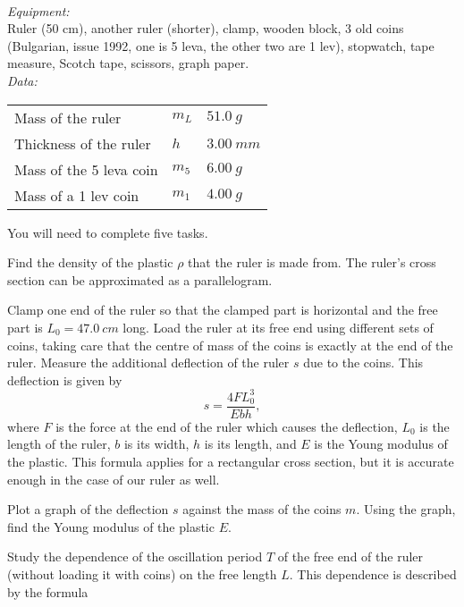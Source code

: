 \documentclass[../TST.tex]{subfiles}
\begin{document}
\begin{eproblem}{\ \\[5pt]}
\textit{Equipment:}\\
Ruler (50 cm), another ruler (shorter), clamp, wooden block, 3 old coins (Bulgarian, issue 1992, one is 5 leva, the other two are 1 lev), stopwatch, tape measure, Scotch tape, scissors, graph paper.\\[5pt]
\textit{Data:}
\begin{center}
\begin{tabular}{@{}lll@{}}
Mass of the ruler & $m_L$  & $\qty{51.0}{g}$  \\
Thickness of the ruler & $h$  & $\qty{3.00}{mm}$  \\
Mass of the 5 leva coin & $m_5$  & $\qty{6.00}{g}$  \\
Mass of a 1 lev coin & $m_1$ & $\qty{4.00}{g}$\\
\end{tabular}
\end{center}
You will need to complete five tasks.
\begin{subpart}
	\item Find the density of the plastic $\rho$ that the ruler is made from. The ruler's cross section can be approximated as a parallelogram.  
\end{subpart}
Clamp one end of the ruler so that the clamped part is horizontal and the free part is $L_0=\qty{47.0}{cm}$ long. Load the ruler at its free end using different sets of coins, taking care that the centre of mass of the coins is exactly at the end of the ruler.  Measure the additional deflection of the ruler $s$ due to the coins. This deflection is given by
\begin{equation*}
s=\frac{4FL_0^3}{Ebh},
\end{equation*}
where $F$ is the force at the end of the ruler which causes the deflection, $L_0$ is the length of the ruler, $b$ is its width, $h$ is its length, and $E$ is the Young modulus of the plastic. This formula applies for a rectangular cross section, but it is accurate enough in the case of our ruler as well. 
\begin{subpart}[resume]
	\item Plot a graph of the deflection $s$ against the mass of the coins $m$. Using the graph, find the Young modulus of the plastic $E$. 
\end{subpart}
Study the dependence of the oscillation period $T$ of the free end of the ruler (without loading it with coins) on the free length $L$. This dependence is described by the formula

\end{eproblem}
\end{document}
